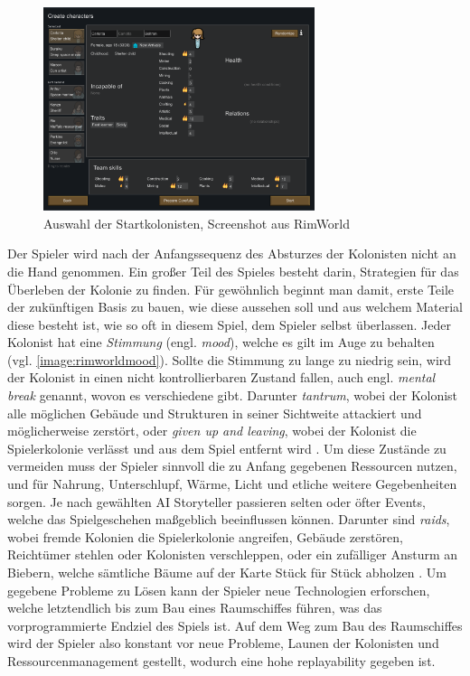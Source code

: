 \begin{figure}
    \begin{center}
        \includegraphics[width=300px]{0.bilder/rimworldcharacter.png}
    \end{center}
    \caption{Auswahl der Startkolonisten, Screenshot aus RimWorld} \label{image:rimworldcharacter}
\end{figure}

Der Spieler wird nach der Anfangssequenz des Absturzes der Kolonisten nicht an die Hand genommen. Ein großer Teil des Spieles besteht darin, Strategien für das Überleben der Kolonie zu finden. Für gewöhnlich beginnt man damit, erste Teile der zukünftigen Basis zu bauen, wie diese aussehen soll und aus welchem Material diese besteht ist, wie so oft in diesem Spiel, dem Spieler selbst überlassen. Jeder Kolonist hat eine \textit{Stimmung} (engl. \textit{mood}), welche es gilt im Auge zu behalten (vgl. \autoref{image:rimworldmood}). Sollte die Stimmung zu lange zu niedrig sein, wird der Kolonist in einen nicht kontrollierbaren Zustand fallen, auch engl. \textit{mental break} genannt, wovon es verschiedene gibt. Darunter \textit{tantrum}, wobei der Kolonist alle möglichen Gebäude und Strukturen in seiner Sichtweite attackiert und möglicherweise zerstört, oder \textit{given up and leaving}, wobei der Kolonist die Spielerkolonie verlässt und aus dem Spiel entfernt wird \cite*[]{rimworld:mentalbreak}. Um diese Zustände zu vermeiden muss der Spieler sinnvoll die zu Anfang gegebenen Ressourcen nutzen, und für Nahrung, Unterschlupf, Wärme, Licht und etliche weitere Gegebenheiten sorgen. Je nach gewählten AI Storyteller passieren selten oder öfter Events, welche das Spielgeschehen maßgeblich beeinflussen können. Darunter sind \textit{raids}, wobei fremde Kolonien die Spielerkolonie angreifen, Gebäude zerstören, Reichtümer stehlen oder Kolonisten verschleppen, oder ein zufälliger Ansturm an Biebern, welche sämtliche Bäume auf der Karte Stück für Stück abholzen \cite*[]{rimworld:events}. Um gegebene Probleme zu Lösen kann der Spieler neue Technologien erforschen, welche letztendlich bis zum Bau eines Raumschiffes führen, was das vorprogrammierte Endziel des Spiels ist. Auf dem Weg zum Bau des Raumschiffes wird der Spieler also konstant vor neue Probleme, Launen der Kolonisten und Ressourcenmanagement gestellt, wodurch eine hohe replayability gegeben ist.

